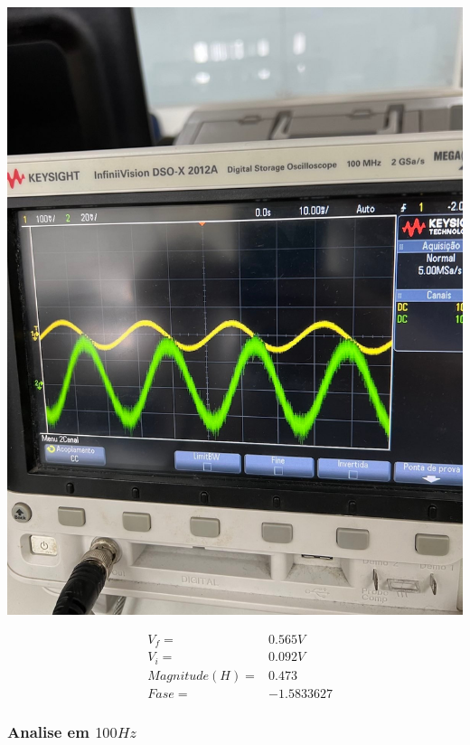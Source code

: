 \documentclass[12pt,twoside, a4paper, twocolumn]{article}
\begin{document}
\begin{adjustbox}{scale=0.18}
    \includegraphics{freq40.jpeg}
\end{adjustbox}

\begin{equation*}
    \begin{aligned}
         & V_f =          & 0.565V     \\
         & V_i =          & 0.092V     \\
         & Magnitude(H) = & 0.473      \\
         & Fase =         & -1.5833627
    \end{aligned}
\end{equation*}


\subsubsection{Analise em $100Hz$}
\subparagraph*{}
\end{document}
